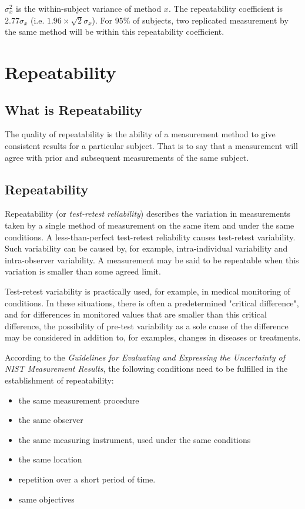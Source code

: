 \documentclass[12pt, a4paper]{article}
\begin{document}
	$\sigma^2_{x}$ is the within-subject variance of method $x$. The repeatability coefficient is $2.77 \sigma_{x}$ (i.e. $1.96 \times \sqrt{2} \sigma_{x}$). For $95\%$ of subjects, two replicated measurement by the same method will be within this repeatability coefficient.
	

	
\section{Repeatability}
\subsection{What is Repeatability}
The quality of repeatability is the ability of a measurement method to give consistent results for a particular subject. That is to say that a measurement will agree with prior and subsequent measurements of the same subject.

\subsection{Repeatability}
Repeatability (or \textit{test-retest reliability})  describes the variation in measurements taken by a single method of measurement on the same item and under the same conditions. 
A less-than-perfect test-retest reliability causes test-retest variability. Such variability can be caused by, for example, intra-individual variability and intra-observer variability. 
A measurement may be said to be repeatable when this variation is smaller than some agreed limit.

Test-retest variability is practically used, for example, in medical monitoring of conditions. In these situations, there is often a predetermined "critical difference", and for differences in monitored values that are smaller than this critical difference, the possibility of pre-test variability as a sole cause of the difference may be considered in addition to, for examples, changes in diseases or treatments.

According to the \textit{Guidelines for Evaluating and Expressing the Uncertainty of NIST Measurement Results}, the following conditions need to be fulfilled in the establishment of repeatability:
\begin{itemize}
	\item	the same measurement procedure
	\item	the same observer
	\item	the same measuring instrument, used under the same conditions
	\item	the same location
	\item	repetition over a short period of time.
	\item  same objectives
\end{itemize}
\bigskip
\end{document}
